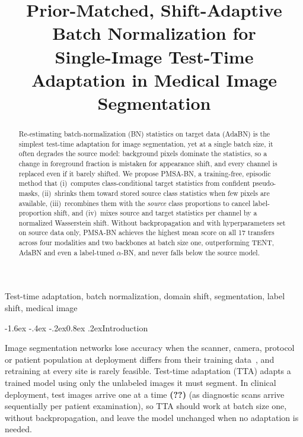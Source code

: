\documentclass{article}
\title{Prior-Matched, Shift-Adaptive Batch Normalization for\\
Single-Image Test-Time Adaptation in Medical Image Segmentation}
\makeatletter
\renewcommand\section{\@startsection{section}{1}{\z@}%
  {-1.6ex \@plus -.4ex \@minus -.2ex}{0.8ex \@plus .2ex}{\normalfont}}
\makeatother
\begin{document}
\ninept   %
\maketitle

\begin{abstract}
Re-estimating batch-normalization (BN) statistics on target data (AdaBN) is the simplest test-time adaptation for image segmentation, yet at a single batch size, it often degrades the source model: background pixels dominate the statistics, so a change in foreground fraction is mistaken for appearance shift, and every channel is replaced even if it barely shifted. We propose PMSA-BN, a training-free, episodic method that (i)~computes class-conditional target statistics from confident pseudo-masks, (ii)~shrinks them toward stored source class statistics when few pixels are available, (iii)~recombines them with the \emph{source} class proportions to cancel label-proportion shift, and (iv)~mixes source and target statistics per channel by a normalized Wasserstein shift. Without backpropagation and with hyperparameters set on source data only, PMSA-BN achieves the highest mean score on all 17 transfers across four modalities and two backbones at batch size one, outperforming TENT, AdaBN and even a label-tuned $\alpha$-BN, and never falls below the source model.
\end{abstract}

\begin{keywords}
Test-time adaptation, batch normalization, domain shift, segmentation, label shift, medical image
\end{keywords}

\section{Introduction}
\label{sec:intro}

Image segmentation networks lose accuracy when the scanner, camera, protocol or patient population at deployment differs from their training
data~\cite{karani2021tta}, and retraining at every site is rarely feasible. Test-time adaptation (TTA) adapts a trained model using only the unlabeled images it must segment. In clinical deployment, test images arrive one at a time \textbf{(??)} (as diagnostic scans arrive sequentially per patient examination), so TTA should work at batch size one, without backpropagation, and leave the model unchanged when no adaptation is needed.
\end{document}
